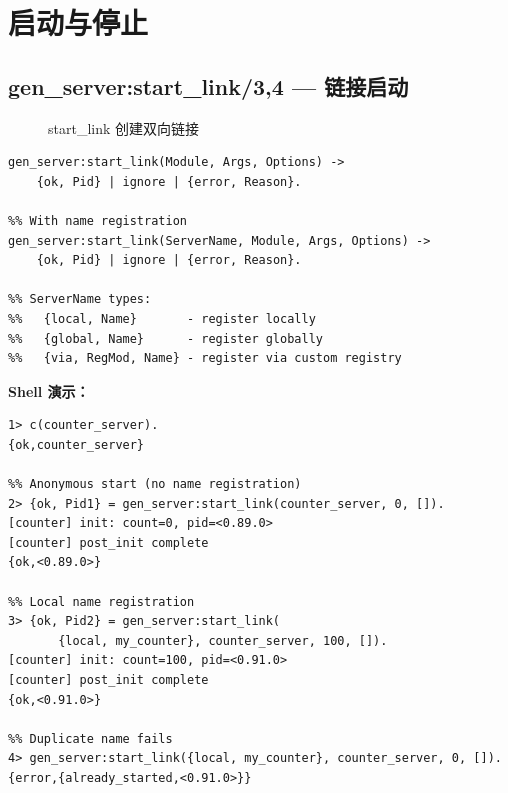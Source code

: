 \documentclass[a4paper,11pt]{article}
\begin{document}
\section{启动与停止}

\subsection{gen\_server:start\_link/3,4 --- 链接启动}

\begin{figure}[H]
\centering
{}
\caption{start\_link 创建双向链接}
\end{figure}

\begin{lstlisting}[style=erlangstyle, caption={start\_link 函数签名}]
%% Without name registration (anonymous)
gen_server:start_link(Module, Args, Options) ->
    {ok, Pid} | ignore | {error, Reason}.

%% With name registration
gen_server:start_link(ServerName, Module, Args, Options) ->
    {ok, Pid} | ignore | {error, Reason}.

%% ServerName types:
%%   {local, Name}       - register locally
%%   {global, Name}      - register globally
%%   {via, RegMod, Name} - register via custom registry
\end{lstlisting}

\textbf{Shell 演示：}

\begin{lstlisting}[style=shellstyle, caption={start\_link 交互演示}]
1> c(counter_server).
{ok,counter_server}

%% Anonymous start (no name registration)
2> {ok, Pid1} = gen_server:start_link(counter_server, 0, []).
[counter] init: count=0, pid=<0.89.0>
[counter] post_init complete
{ok,<0.89.0>}

%% Local name registration
3> {ok, Pid2} = gen_server:start_link(
       {local, my_counter}, counter_server, 100, []).
[counter] init: count=100, pid=<0.91.0>
[counter] post_init complete
{ok,<0.91.0>}

%% Duplicate name fails
4> gen_server:start_link({local, my_counter}, counter_server, 0, []).
{error,{already_started,<0.91.0>}}
\end{lstlisting}
\end{document}
